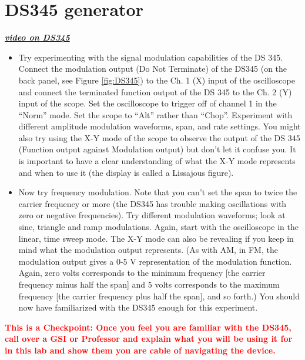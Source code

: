 \documentclass{../lab}
\begin{document}
\section{DS345 generator} \href{http://experimentationlab.berkeley.edu/ds345}{\emph{\textbf{video on DS345}}}
\begin{itemize}
    \item Try experimenting with the signal modulation capabilities of the DS 345. Connect the modulation output (Do Not Terminate) of the DS345 (on the back panel, see Figure \ref{fig:DS345}) to the Ch. 1 (X) input of the oscilloscope and connect the terminated function output of the DS 345 to the Ch. 2 (Y) input of the scope. Set the oscilloscope to trigger off of channel 1 in the ``Norm'' mode. Set the scope to ``Alt'' rather than ``Chop''. Experiment with different amplitude modulation waveforms, span, and rate settings. You might also try using the X-Y mode of the scope to observe the output of the DS 345 (Function output against Modulation output) but don't let it confuse you. It is important to have a clear understanding of what the X-Y mode represents and when to use it (the display is called a Lissajous figure).

    \item Now try frequency modulation. Note that you can't set the span to twice the carrier frequency or more (the DS345 has trouble making oscillations with zero or negative frequencies). Try different modulation waveforms; look at sine, triangle and ramp modulations. Again, start with the oscilloscope in the linear, time sweep mode. The X-Y mode can also be revealing if you keep in mind what the modulation output represents. (As with AM, in FM, the modulation output gives a 0-5 V representation of the modulation function. Again, zero volts corresponds to the minimum frequency [the carrier frequency minus half the span] and 5 volts corresponds to the maximum frequency [the carrier frequency plus half the span], and so forth.) You should now have familiarized with the DS345 enough for this experiment.
\end{itemize}

\noindent\textbf{\textcolor{red}{This is a Checkpoint: Once you feel you are familiar with the DS345, call over a GSI or Professor and explain what you will be using it for in this lab and show them you are cable of navigating the device.}}
\end{document}
